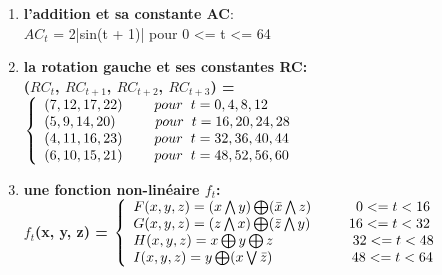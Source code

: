 \documentclass[a4paper,11pt,french]{article}
\begin{document}
\begin{enumerate}
\item {\bf{l'addition et sa constante AC}}:\\
$AC_{t}$ = 2|sin(t + 1)| \hspace{.5cm} pour 0 <= t <= 64\\

\item \bf{la rotation gauche et ses constantes RC}:\\
($RC_{t}$, $RC_{t+1}$, $RC_{t+2}$, $RC_{t+3}$) =
$\left\{
\begin{array}{l}
  (7, 12, 17, 22)   \hspace{.8cm}pour \hspace{.2cm} t = 0, 4, 8, 12 \\
  (5, 9, 14, 20)  \hspace{1cm}pour \hspace{.2cm} t = 16, 20, 24, 28 \\
  (4, 11, 16, 23)  \hspace{.8cm}pour \hspace{.2cm} t = 32, 36, 40, 44 \\
  (6, 10, 15, 21)  \hspace{.8cm}pour \hspace{.2cm} t = 48, 52, 56, 60 \\
\end{array}
\right.$
\vspace{.5cm}
\item \bf{une fonction non-linéaire $f_{t}$}:\\

$f_{t}$(x, y, z) =
$\left\{
\begin{array}{l}
  F(x, y, z) = (x  \bigwedge y) \bigoplus (\bar x \bigwedge z) \hspace{1.128cm} 0 <= t < 16\\
  G(x, y, z) = (z  \bigwedge x) \bigoplus (\bar z \bigwedge y) \hspace{.97cm} 16 <= t < 32\\
  H(x, y, z) = x \bigoplus y \bigoplus z \hspace{2cm} 32 <= t < 48\\
  I(x, y, z) = y \bigoplus (x \bigvee \bar z) \hspace{2cm} 48 <= t < 64\\
\end{array}
\right.$
\vspace{.5cm}
\end{enumerate}
\end{document}

